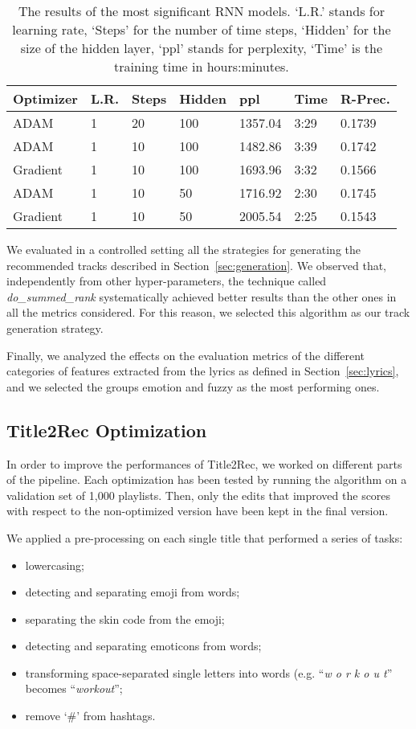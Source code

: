 \begin{table}
\begin{tabular}{@{}lllllll@{}}
\toprule
Optimizer & L.R. & Steps & Hidden  & ppl     & Time & R-Prec. \\ \midrule
ADAM      & 1    & 20    & 100     & 1357.04 & 3:29 & 0.1739  \\
ADAM      & 1    & 10    & 100     & 1482.86 & 3:39 & 0.1742  \\
Gradient  & 1    & 10    & 100     & 1693.96 & 3:32 & 0.1566  \\
ADAM      & 1    & 10    & 50      & 1716.92 & 2:30 & 0.1745  \\
Gradient  & 1    & 10    & 50      & 2005.54 & 2:25 & 0.1543  \\ \bottomrule
\end{tabular}
\caption{The results of the most significant RNN models. `L.R.' stands for learning rate, `Steps' for the number of time steps, `Hidden' for the size of the hidden layer, `ppl' stands for perplexity, `Time' is the training time in hours:minutes.}
\label{tab:rnn_opt}
\end{table}

We evaluated in a controlled setting all the strategies for generating the recommended tracks described in Section~\ref{sec:generation}. We observed that, independently from other hyper-parameters, the technique called \textit{do\_summed\_rank} systematically achieved better results than the other ones in all the metrics considered. For this reason, we selected this algorithm as our track generation strategy.

Finally, we analyzed the effects on the evaluation metrics of the different categories of features extracted from the lyrics as defined in Section~\ref{sec:lyrics}, and we selected the groups emotion and fuzzy as the most performing ones.

\subsection{Title2Rec Optimization}
In order to improve the performances of Title2Rec, we worked on different parts of the pipeline. Each optimization has been tested by running the algorithm on a validation set of 1,000 playlists. Then, only the edits that improved the scores with respect to the non-optimized version have been kept in the final version.

We applied a pre-processing on each single title that performed a series of tasks:
\begin{itemize}
    \item lowercasing;
    \item detecting and separating emoji from words;
    \item separating the skin code from the emoji;
    \item detecting and separating emoticons from words;
    \item transforming space-separated single letters into words (e.g. ``\textit{w o r k o u t}'' becomes ``\textit{workout}'';
    \item remove `\#' from hashtags.
\end{itemize}

